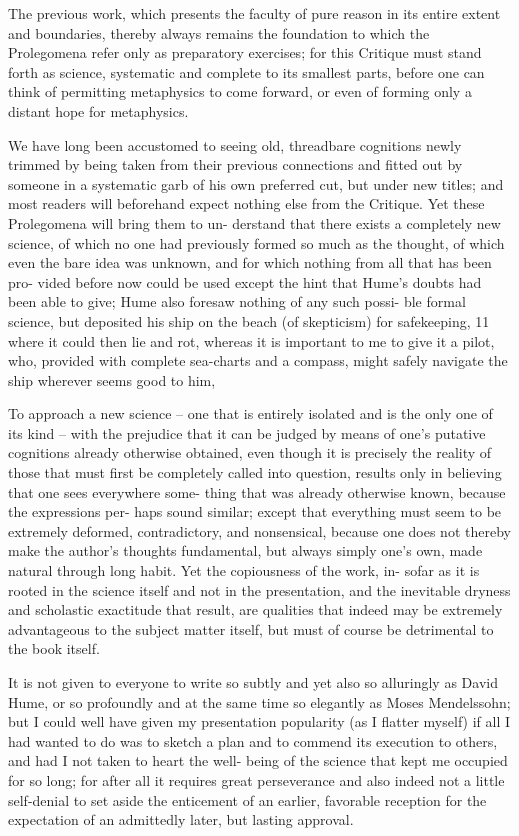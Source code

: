 The previous work, which presents the faculty of pure reason in its
entire extent and boundaries, thereby always remains the foundation to
which the Prolegomena refer only as preparatory exercises; for this Critique
must stand forth as science, systematic and complete to its smallest parts,
before one can think of permitting metaphysics to come forward, or even
of forming only a distant hope for metaphysics.

We have long been accustomed to seeing old, threadbare cognitions
newly trimmed by being taken from their previous connections and
ﬁtted out by someone in a systematic garb of his own preferred cut,
but under new titles; and most readers will beforehand expect nothing
else from the Critique. Yet these Prolegomena will bring them to un-
derstand that there exists a completely new science, of which no one
had previously formed so much as the thought, of which even the bare
idea was unknown, and for which nothing from all that has been pro-
vided before now could be used except the hint that Hume’s doubts
had been able to give; Hume also foresaw nothing of any such possi-
ble formal science, but deposited his ship on the beach (of skepticism)
for safekeeping, 11 where it could then lie and rot, whereas it is important
to me to give it a pilot, who, provided with complete sea-charts and a
compass, might safely navigate the ship wherever seems good to him,

To approach a new science – one that is entirely isolated and is the
only one of its kind – with the prejudice that it can be judged by means
of one’s putative cognitions already otherwise obtained, even though
it is precisely the reality of those that must ﬁrst be completely called
into question, results only in believing that one sees everywhere some-
thing that was already otherwise known, because the expressions per-
haps sound similar; except that everything must seem to be extremely
deformed, contradictory, and nonsensical, because one does not thereby
make the author’s thoughts fundamental, but always simply one’s own,
made natural through long habit. Yet the copiousness of the work, in-
sofar as it is rooted in the science itself and not in the presentation, and
the inevitable dryness and scholastic exactitude that result, are qualities
that indeed may be extremely advantageous to the subject matter itself,
but must of course be detrimental to the book itself.

It is not given to everyone to write so subtly and yet also so alluringly as
David Hume, or so profoundly and at the same time so elegantly as Moses
Mendelssohn; but I could well have given my presentation popularity
(as I ﬂatter myself) if all I had wanted to do was to sketch a plan and to
commend its execution to others, and had I not taken to heart the well-
being of the science that kept me occupied for so long; for after all it
requires great perseverance and also indeed not a little self-denial to set
aside the enticement of an earlier, favorable reception for the expectation
of an admittedly later, but lasting approval.

